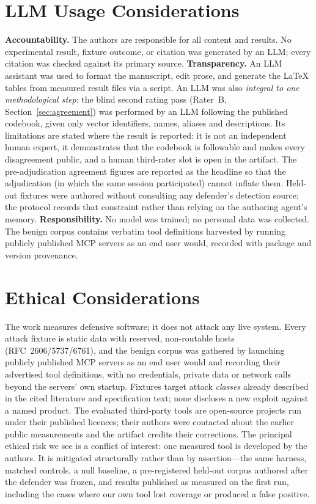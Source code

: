 \documentclass[conference]{IEEEtran}
\begin{document}
\section*{LLM Usage Considerations}
\textbf{Accountability.} The authors are responsible for all content and results. No experimental result, fixture outcome, or citation was generated by an LLM; every citation was checked against its primary source.
\textbf{Transparency.} An LLM assistant was used to format the manuscript, edit prose, and generate the \LaTeX{} tables from measured result files via a script. An LLM was also \emph{integral to one methodological step}: the blind second rating pass (Rater~B, Section~\ref{sec:agreement}) was performed by an LLM following the published codebook, given only vector identifiers, names, aliases and descriptions. Its limitations are stated where the result is reported: it is not an independent human expert, it demonstrates that the codebook is followable and makes every disagreement public, and a human third-rater slot is open in the artifact. The pre-adjudication agreement figures are reported as the headline so that the adjudication (in which the same session participated) cannot inflate them. Held-out fixtures were authored without consulting any defender's detection source; the protocol records that constraint rather than relying on the authoring agent's memory.
\textbf{Responsibility.} No model was trained; no personal data was collected. The benign corpus contains verbatim tool definitions harvested by running publicly published MCP servers as an end user would, recorded with package and version provenance.

\section*{Ethical Considerations}
The work measures defensive software; it does not attack any live system. Every attack fixture is static data with reserved, non-routable hosts (RFC~2606/5737/6761), and the benign corpus was gathered by launching publicly published MCP servers as an end user would and recording their advertised tool definitions, with no credentials, private data or network calls beyond the servers' own startup. Fixtures target attack \emph{classes} already described in the cited literature and specification text; none discloses a new exploit against a named product. The evaluated third-party tools are open-source projects run under their published licences; their authors were contacted about the earlier public measurements and the artifact credits their corrections. The principal ethical risk we see is a conflict of interest: one measured tool is developed by the authors. It is mitigated structurally rather than by assertion---the same harness, matched controls, a null baseline, a pre-registered held-out corpus authored after the defender was frozen, and results published as measured on the first run, including the cases where our own tool lost coverage or produced a false positive.
\end{document}

